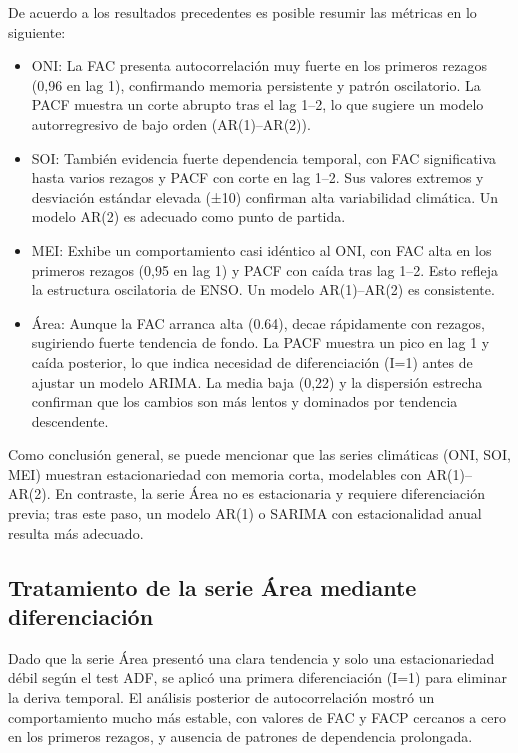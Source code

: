 De acuerdo a los resultados precedentes es posible resumir las métricas en lo siguiente:
\begin{itemize}
    \item ONI: La FAC presenta autocorrelación muy fuerte en los primeros rezagos 
    (0,96 en lag 1), confirmando memoria persistente y patrón oscilatorio. La PACF muestra 
    un corte abrupto tras el lag 1–2, lo que sugiere un modelo autorregresivo de bajo orden 
    (AR(1)–AR(2)).
    
    \item SOI: También evidencia fuerte dependencia temporal, con FAC significativa 
    hasta varios rezagos y PACF con corte en lag 1–2. Sus valores extremos y desviación 
    estándar elevada (±10) confirman alta variabilidad climática. Un modelo AR(2) es adecuado 
    como punto de partida.
    
    \item MEI: Exhibe un comportamiento casi idéntico al ONI, con FAC alta en los 
    primeros rezagos (0,95 en lag 1) y PACF con caída tras lag 1–2. Esto refleja la estructura 
    oscilatoria de ENSO. Un modelo AR(1)–AR(2) es consistente.
    
    \item Área: Aunque la FAC arranca alta (0.64), decae rápidamente con rezagos, 
    sugiriendo fuerte tendencia de fondo. La PACF muestra un pico en lag 1 y caída posterior, 
    lo que indica necesidad de diferenciación (I=1) antes de ajustar un modelo ARIMA. La media 
    baja (0,22) y la dispersión estrecha confirman que los cambios son más lentos y dominados 
    por tendencia descendente.
\end{itemize}




Como conclusión general, se puede mencionar que las series climáticas (ONI, SOI, MEI) muestran 
estacionariedad con memoria corta, modelables con AR(1)–AR(2). En contraste, la serie 
Área no es estacionaria y requiere diferenciación previa; tras este paso, un modelo AR(1) 
o SARIMA con estacionalidad anual resulta más adecuado.

\subsection{Tratamiento de la serie Área mediante diferenciación}

Dado que la serie Área presentó una clara tendencia y solo una estacionariedad débil según 
el test ADF, se aplicó una primera diferenciación (I=1) para eliminar la deriva temporal. 
El análisis posterior de autocorrelación mostró un comportamiento mucho más estable, con 
valores de FAC y FACP cercanos a cero en los primeros rezagos, y ausencia de patrones de 
dependencia prolongada.

